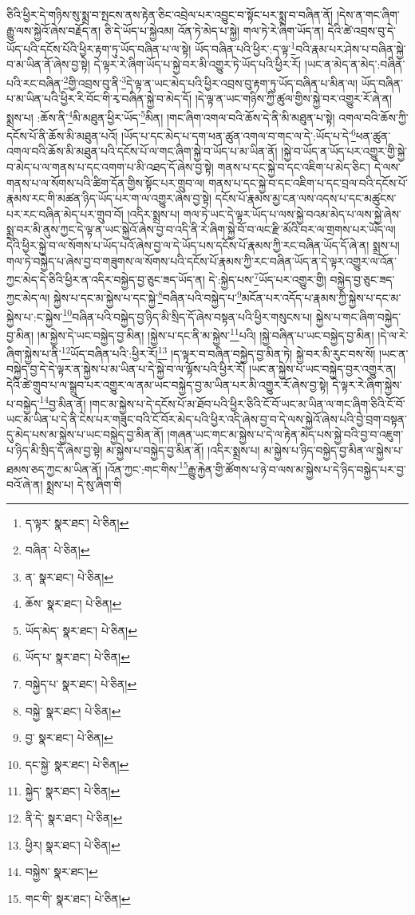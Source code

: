 ཅིའི་ཕྱིར་དེ་གཉིས་སུ་སྨྲ་བ་སྤངས་ནས་རྟེན་ཅིང་འབྲེལ་པར་འབྱུང་བ་སྟོང་པར་སྨྲ་བ་བཞིན་ནོ། །དེས་ན་གང་ཞིག་རྒྱུ་ལས་སྐྱེའོ་ཞེས་བརྗོད་ན། ཅི་དེ་ཡོད་པ་སྐྱེའམ། འོན་ཏེ་མེད་པ་སྐྱེ། གལ་ཏེ་རེ་ཞིག་ཡོད་ན། དེའི་ཚེ་འབྲས་བུ་དེ་ཡོད་པའི་དངོས་པོའི་ཕྱིར་རྟག་ཏུ་ཡོད་བཞིན་པ་ལ་སྟེ། ཡོད་བཞིན་པའི་ཕྱིར་:ད་ལྟ་\footnote{ད་ལྟར་  སྣར་ཐང་།  པེ་ཅིན། }བའི་རྣམ་པར་ཤེས་པ་བཞིན་སྐྱེ་བ་མ་ཡིན་ནོ་ཞེས་བྱ་སྟེ། དེ་ལྟར་རེ་ཞིག་ཡོད་པ་སྐྱེ་བར་མི་འགྱུར་ཏེ་ཡོད་པའི་ཕྱིར་རོ། །ཡང་ན་མེད་ན་མེད་:བཞིན་པའི་རང་བཞིན་\footnote{བཞིན་  པེ་ཅིན། }གྱི་འབྲས་བུ་ནི་\footnote{ན་  སྣར་ཐང་།  པེ་ཅིན། }དེ་ལྟ་ན་ཡང་མེད་པའི་ཕྱིར་འབྲས་བུ་རྟག་ཏུ་ཡོད་བཞིན་པ་མིན་ལ། ཡོད་བཞིན་པ་མ་ཡིན་པའི་ཕྱིར་རི་བོང་གི་རྭ་བཞིན་སྐྱེ་བ་མེད་དོ། །དེ་ལྟ་ན་ཡང་གཉིས་ཀྱི་ཚུལ་གྱིས་སྐྱེ་བར་འགྱུར་རོ་ཞེ་ན། སྨྲས་པ། :ཆོས་ནི་\footnote{ཆོས་  སྣར་ཐང་།  པེ་ཅིན། }མི་མཐུན་ཕྱིར་ཡོད་\footnote{ཡོད་མེད་  སྣར་ཐང་།  པེ་ཅིན། }མིན། །གང་ཞིག་འགལ་བའི་ཆོས་དེ་ནི་མི་མཐུན་པ་སྟེ། འགལ་བའི་ཆོས་ཀྱི་དངོས་པོ་ནི་ཆོས་མི་མཐུན་པའོ། །ཡོད་པ་དང་མེད་པ་དག་ཕན་ཚུན་འགལ་བ་གང་ལ་དེ་:ཡོད་པ་དེ་\footnote{ཡོད་པ་  སྣར་ཐང་།  པེ་ཅིན། }ཕན་ཚུན་འགལ་བའི་ཆོས་མི་མཐུན་པའི་དངོས་པོ་ལ་གང་ཞིག་སྐྱེ་བ་ཡོད་པ་མ་ཡིན་ནོ། །སྐྱེ་བ་ཡོད་ན་ཡོད་པར་འགྱུར་གྱི་སྐྱེ་བ་མེད་པ་ལ་གནས་པ་དང་འགག་པ་མི་འཐད་དོ་ཞེས་བྱ་སྟེ། གནས་པ་དང་སྐྱེ་བ་དང་འཇིག་པ་མེད་ཅིང་། དེ་ལས་གནས་པ་ལ་སོགས་པའི་ཚིག་དོན་གྱིས་སྟོང་པར་གྲུབ་ལ། གནས་པ་དང་སྐྱེ་བ་དང་འཇིག་པ་དང་བྲལ་བའི་དངོས་པོ་རྣམས་རང་གི་མཚན་ཉིད་ཡོད་པར་ག་ལ་འགྱུར་ཞེས་བྱ་སྟེ། དངོས་པོ་རྣམས་མྱ་ངན་ལས་འདས་པ་དང་མཚུངས་པར་རང་བཞིན་མེད་པར་གྲུབ་བོ། །འདིར་སྨྲས་པ། གལ་ཏེ་ཡང་དེ་ལྟར་ཡོད་པ་ལས་སྐྱེ་བའམ་མེད་པ་ལས་སྐྱེ་ཞེས་སྨྲ་བར་མི་ནུས་ཀྱང་དེ་ལྟ་ན་ཡང་སྐྱེའོ་ཞེས་བྱ་བ་འདི་ནི་རེ་ཞིག་སྐྱེ་བོ་བ་ལང་རྫི་མོའི་བར་ལ་གྲགས་པར་ཡོད་ལ། དེའི་ཕྱིར་སྐྱེ་བ་ལ་སོགས་པ་ཡོད་པའོ་ཞེས་བྱ་ལ་དེ་ཡོད་པས་དངོས་པོ་རྣམས་ཀྱི་རང་བཞིན་ཡོད་དོ་ཞེ་ན། སྨྲས་པ། གལ་ཏེ་བསྐྱེད་པ་ཞེས་བྱ་བ་གཟུགས་ལ་སོགས་པའི་དངོས་པོ་རྣམས་ཀྱི་རང་བཞིན་ཡོད་ན་དེ་ལྟར་འགྱུར་ལ་འོན་ཀྱང་མེད་དེ་ཅིའི་ཕྱིར་ན་འདིར་བསྐྱེད་བྱ་ཅུང་ཟད་ཡོད་ན། དེ་:སྐྱེད་པས་\footnote{བསྐྱེད་པ་  སྣར་ཐང་།  པེ་ཅིན། }ཡོད་པར་འགྱུར་གྱི། བསྐྱེད་བྱ་ཅུང་ཟད་ཀྱང་མེད་ལ། སྐྱེས་པ་དང་མ་སྐྱེས་པ་དང་སྐྱེ་\footnote{བསྐྱེ་  སྣར་ཐང་།  པེ་ཅིན། }བཞིན་པའི་བསྐྱེད་པ་\footnote{བྱ་  སྣར་ཐང་།  པེ་ཅིན། }མངོན་པར་འདོད་པ་རྣམས་ཀྱི་སྐྱེས་པ་དང་མ་སྐྱེས་པ་:ང་སྐྱེས་\footnote{དང་སྐྱེ་  སྣར་ཐང་།  པེ་ཅིན། }བཞིན་པའི་བསྐྱེད་བྱ་ཉིད་མི་སྲིད་དོ་ཞེས་བསྟན་པའི་ཕྱིར་གསུངས་པ། སྐྱེས་པ་གང་ཞིག་བསྐྱེད་བྱ་མིན། །མ་སྐྱེས་དེ་ཡང་བསྐྱེད་བྱ་མིན། །སྐྱེས་པ་དང་ནི་མ་སྐྱེས་\footnote{སྐྱེད་  སྣར་ཐང་།  པེ་ཅིན། }པའི། །སྐྱེ་བཞིན་པ་ཡང་བསྐྱེད་བྱ་མིན། །དེ་ལ་རེ་ཞིག་སྐྱེས་པ་ནི་\footnote{ནི་དེ་  སྣར་ཐང་།  པེ་ཅིན། }ཡོད་བཞིན་པའི་:ཕྱིར་རོ།\footnote{ཕྱིར།  སྣར་ཐང་།  པེ་ཅིན། } །ད་ལྟར་བ་བཞིན་བསྐྱེད་བྱ་མིན་ཏེ། སྐྱེ་བར་མི་རུང་བས་སོ། །ཡང་ན་བསྐྱེད་བྱ་དེ་དེ་ལྟར་ན་སྐྱེས་པ་མ་ཡིན་པ་དེ་སྐྱེ་བ་ལ་ལྟོས་པའི་ཕྱིར་རོ། །ཡང་ན་སྐྱེས་པ་ཡང་བསྐྱེད་བྱར་འགྱུར་ན། དེའི་ཚེ་གྲུབ་པ་ལ་སྒྲུབ་པར་འགྱུར་ལ་ནམ་ཡང་བསྐྱེད་བྱ་མ་ཡིན་པར་མི་འགྱུར་རོ་ཞེས་བྱ་སྟེ། དེ་ལྟར་རེ་ཞིག་སྐྱེས་པ་བསྐྱེད་\footnote{བསྐྱེས་  སྣར་ཐང་། }བྱ་མིན་ནོ། །གང་མ་སྐྱེས་པ་དེ་དངོས་པོ་མ་ཐོབ་པའི་ཕྱིར་ཅིའི་ངོ་བོ་ཡང་མ་ཡིན་ལ་གང་ཞིག་ཅིའི་ངོ་བོ་ཡང་མ་ཡིན་པ་དེ་ནི་ངེས་པར་གཟུང་བའི་ངོ་བོར་མེད་པའི་ཕྱིར་འདི་ཞེས་བྱ་བ་དེ་ལས་སྐྱེའོ་ཞེས་པའི་བྱེ་བྲག་བསྟན་དུ་མེད་པས་མ་སྐྱེས་པ་ཡང་བསྐྱེད་བྱ་མིན་ནོ། །གཞན་ཡང་གང་མ་སྐྱེས་པ་དེ་ལ་རྟེན་མེད་པས་སྐྱེ་བའི་བྱ་བ་འཇུག་པ་ཉིད་མི་སྲིད་དོ་ཞེས་བྱ་སྟེ། མ་སྐྱེས་པ་བསྐྱེད་བྱ་མིན་ནོ། །འདིར་སྨྲས་པ། མ་སྐྱེས་པ་ཉིད་བསྐྱེད་བྱ་མིན་ལ་སྐྱེས་པ་ཐམས་ཅད་ཀྱང་མ་ཡིན་ནོ། །འོན་ཀྱང་:གང་གིས་\footnote{གང་གི་  སྣར་ཐང་།  པེ་ཅིན། }རྒྱུ་རྐྱེན་གྱི་ཚོགས་པ་ཉེ་བ་ལས་མ་སྐྱེས་པ་དེ་ཉིད་བསྐྱེད་པར་བྱ་བའོ་ཞེ་ན། སྨྲས་པ། དེ་སུ་ཞིག་གི 
